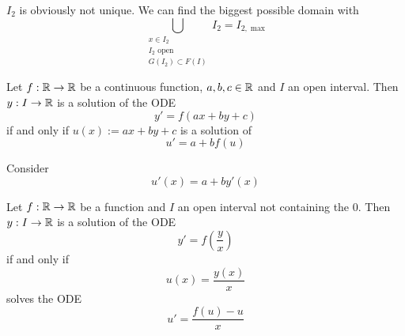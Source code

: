 \documentclass[../../script.tex]{subfiles}
\begin{document}
\begin{rem}
    $I_2$ is obviously not unique. We can find the biggest possible domain with 
    \[
        \bigcup_{\substack{x \in I_2 \\ I_2 \text{ open} \\ G(I_2) \subset F(I)}} I_2 = I_{2, \max}
    \]
\end{rem}

\begin{thm}
    Let $f: \mathbb{R} \rightarrow \mathbb{R}$ be a continuous function, $a, b, c \in \mathbb{R}$ and $I$ an open interval.
    Then $y: I \rightarrow \mathbb{R}$ is a solution of the ODE 
    \[
        y' = f(ax + by + c)
    \]
    if and only if $ u(x) := ax + by + c$ is a solution of 
    \[
        u' = a + bf(u)
    \]
\end{thm}
\begin{hproof}
    Consider 
    \[
        u'(x) = a + by'(x)
    \]
\end{hproof}

\begin{eg}
    Let $f: \mathbb{R} \rightarrow \mathbb{R}$ be a function and $I$ an open interval not containing the $0$.
    Then $y: I \rightarrow \mathbb{R}$ is a solution of the ODE 
    \[
        y' = f(\frac{y}{x})
    \]
    if and only if 
    \[
        u(x) = \frac{y(x)}{x}
    \]
    solves the ODE
    \[
        u' = \frac{f(u) - u}{x}
    \]
\end{eg}
\end{document}
